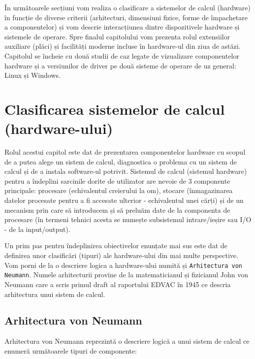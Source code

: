 În următoarele secțiuni vom realiza o clasificare a sistemelor de calcul
(hardware) în funcție de diverse criterii (arhitecturi, dimensiuni fizice, forme
de împachetare a componentelor) și vom descrie interacțiunea dintre
dispozitivele hardware și sistemele de operare. Spre finalul capitolului vom
prezenta rolul extensiilor auxiliare (plăci) și facilități moderne incluse în
hardware-ul din ziua de astăzi. Capitolul se încheie cu două studii de caz
legate de vizualizare componentelor hardware și a versiunilor de driver pe două
sisteme de operare de uz general: Linux și Windows.

\section{Clasificarea sistemelor de calcul (hardware-ului)}
\label{sec:hardware-class}

Rolul acestui capitol este dat de prezentarea componentelor hardware cu scopul
de a putea alege un sistem de calcul, diagnostica o problema cu un sistem de
calcul și de a instala software-ul potrivit. Sistemul de calcul (sistemul
hardware) pentru a îndeplini sarcinile dorite de utilizator are nevoie de 3
componente principale: procesare (echivalentul creierului la om), stocare
(înmagazinarea datelor procesate pentru a fi accesate ulterior - echivalentul
unei cărți) și de un mecanism prin care să introducem și să preluăm date de la
componenta de procesare (în termeni tehnici acesta se numește subsistemul
intrare/ieșire sau I/O - de la input/output).

Un prim pas pentru îndeplinirea obiectivelor enunțate mai sus este dat de
definirea unor clasificări (tipuri) ale hardware-ului din mai multe perspective.
Vom porni de la o descriere logica a hardware-ului numită și \texttt{Arhitectura
von Neumann}. Numele arhitecturii provine de la matematicianul și fizicianul
John von Neumann care a scris primul draft al raportului EDVAC
 în 1945 ce
descria arhitectura unui sistem de calcul.


\subsection{Arhitectura von Neumann}
\label{sec:hardware-class-neumann}

Arhitectura von Neumann reprezintă o descriere logică a unui sistem de calcul ce
enumeră următoarele tipuri de componente:

